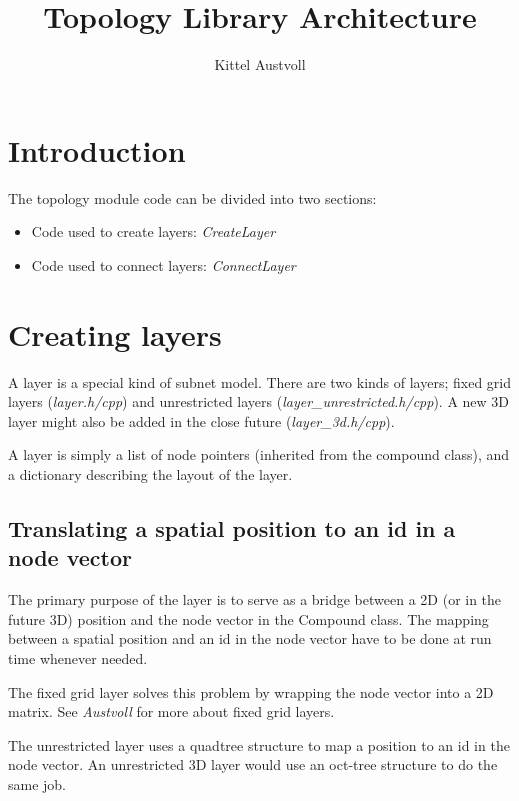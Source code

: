 \documentclass{article}
\title{Topology Library Architecture}
\author{Kittel Austvoll}
\begin{document}
\maketitle 

\tableofcontents

\section{Introduction}

The topology module code can be divided into two sections:

\begin{itemize}
\item Code used to create layers: \emph{CreateLayer}
\item Code used to connect layers: \emph{ConnectLayer}
\end{itemize}

\section{Creating layers}

A layer is a special kind of subnet model. There are two kinds of layers; fixed grid layers (\emph{layer.h/cpp}) and unrestricted layers (\emph{layer\_unrestricted.h/cpp}). A new 3D layer might also be added in the close future (\emph{layer\_3d.h/cpp}).

A layer is simply a list of node pointers (inherited from the compound class), and a dictionary describing the layout of the layer. 

\subsection{Translating a spatial position to an id in a node vector}

The primary purpose of the layer is to serve as a bridge between a 2D (or in the future 3D) position and the node vector in the Compound class. The mapping between a spatial position and an id in the node vector have to be done at run time whenever needed.

The fixed grid layer solves this problem by wrapping the node vector into a 2D matrix. See \emph{Austvoll}\cite{austvoll} for more about fixed grid layers.

The unrestricted layer uses a quadtree structure to map a position to an id in the node vector. An unrestricted 3D layer would use an oct-tree structure to do the same job.
\end{document}
